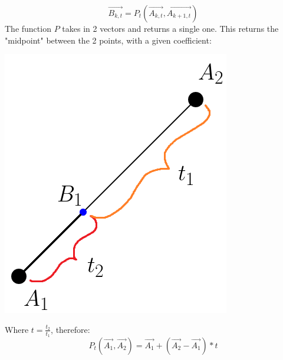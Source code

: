 \documentclass{article}
\begin{document}
\begin{equation} \label{eq:3}
    \vec{B_{k, t}} = P_t(\vec{A_{k, t}}, \vec{A_{k+1, t}})  
\end{equation}
\newpage
The function $P$ takes in 2 vectors and returns a single one. This returns the "midpoint" between the 2 points, with a given coefficient:
\begin{center}
    \includegraphics[scale=0.3]{t_ratio}
\end{center}
Where $t = \frac{t_2}{t_1}$, therefore:
\begin{equation}
    P_t(\vec{A_1}, \vec{A_2}) =  \vec{A_1} + (\vec{A_2} - \vec{A_1}) * t
\end{equation}
\end{document}
